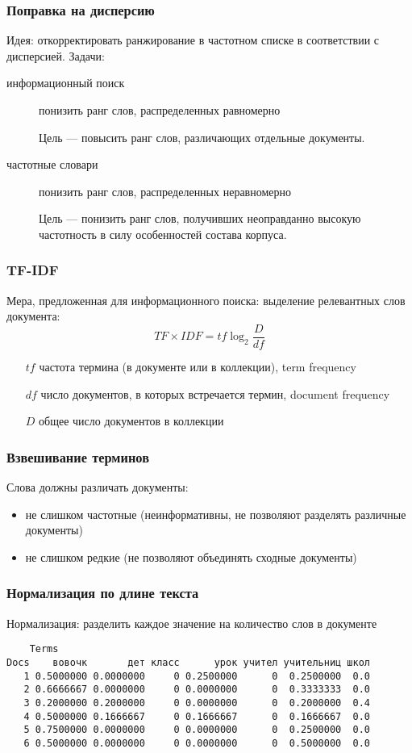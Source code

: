 \documentclass[svgnames]{beamer}
\begin{document}
\begin{frame}
  \frametitle{Поправка на дисперсию}
  Идея: откорректировать ранжирование в частотном списке в
  соответствии с дисперсией. Задачи:
  \begin{description}
  \item[информационный поиск] понизить ранг слов, распределенных
    равномерно

    Цель — повысить ранг слов, различающих отдельные документы.

  \item[частотные словари] понизить ранг слов, распределенных
    неравномерно

    Цель — понизить ранг слов, получивших неоправданно высокую
    частотность в силу особенностей состава корпуса.
  \end{description}
\end{frame}

\begin{frame}
  \frametitle{TF-IDF}
  Мера, предложенная для информационного поиска: выделение релевантных
  слов документа:
  \begin{equation}
    TF \times IDF = tf\log_2\frac{D}{df}
  \end{equation}
  \begin{itemize}
  \item[$tf$] частота термина (в документе или в коллекции), term frequency
  \item[$df$] число документов, в которых встречается термин, document
    frequency
  \item[$D$] общее число документов в коллекции
  \end{itemize}
\end{frame}

\begin{frame}
  \frametitle{Взвешивание терминов}
  Слова должны \alert{различать} документы:
  \begin{itemize}
  \item не слишком частотные (неинформативны, не позволяют разделять
    различные документы)
  \item не слишком редкие (не позволяют объединять сходные документы)
  \end{itemize}
\end{frame}

\begin{frame}[fragile]
  \frametitle{Нормализация по длине текста}
  Нормализация: разделить каждое значение на количество слов в документе
  \footnotesize
\begin{verbatim}
    Terms
Docs    вовочк       дет класс      урок учител учительниц школ
   1 0.5000000 0.0000000     0 0.2500000      0  0.2500000  0.0
   2 0.6666667 0.0000000     0 0.0000000      0  0.3333333  0.0
   3 0.2000000 0.2000000     0 0.0000000      0  0.2000000  0.4
   4 0.5000000 0.1666667     0 0.1666667      0  0.1666667  0.0
   5 0.7500000 0.0000000     0 0.0000000      0  0.2500000  0.0
   6 0.5000000 0.0000000     0 0.0000000      0  0.5000000  0.0
\end{verbatim}
\end{frame}
\end{document}
